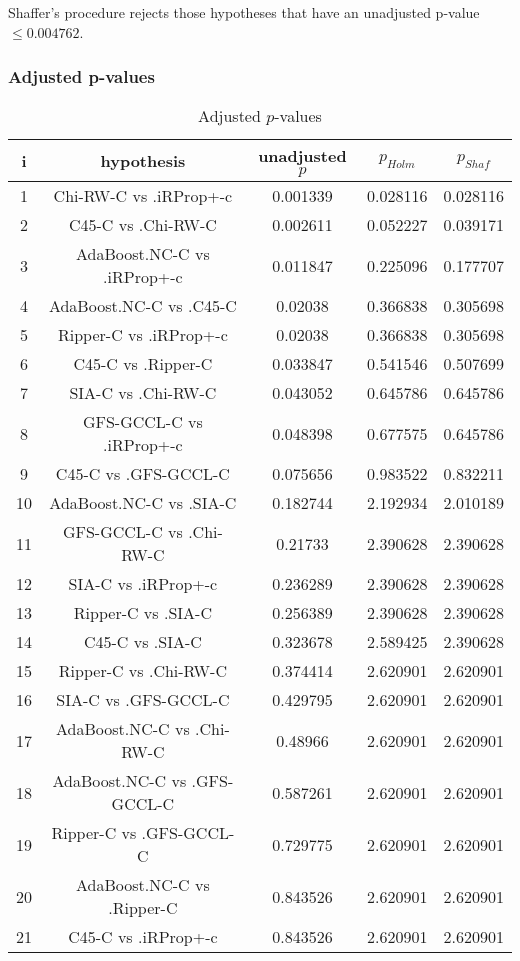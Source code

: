 \documentclass[a4paper,10pt]{article}
\begin{document}
Shaffer's procedure rejects those hypotheses that have an unadjusted p-value $\le0.004762$.

\pagebreak

\subsubsection{Adjusted p-values}

\begin{table}[!htp]
\centering\scriptsize
\begin{tabular}{ccccc}
i&hypothesis&unadjusted $p$&$p_{Holm}$&$p_{Shaf}$\\
\hline1&Chi-RW-C vs .iRProp+-c&0.001339&0.028116&0.028116\\
2&C45-C vs .Chi-RW-C&0.002611&0.052227&0.039171\\
3&AdaBoost.NC-C vs .iRProp+-c&0.011847&0.225096&0.177707\\
4&AdaBoost.NC-C vs .C45-C&0.02038&0.366838&0.305698\\
5&Ripper-C vs .iRProp+-c&0.02038&0.366838&0.305698\\
6&C45-C vs .Ripper-C&0.033847&0.541546&0.507699\\
7&SIA-C vs .Chi-RW-C&0.043052&0.645786&0.645786\\
8&GFS-GCCL-C vs .iRProp+-c&0.048398&0.677575&0.645786\\
9&C45-C vs .GFS-GCCL-C&0.075656&0.983522&0.832211\\
10&AdaBoost.NC-C vs .SIA-C&0.182744&2.192934&2.010189\\
11&GFS-GCCL-C vs .Chi-RW-C&0.21733&2.390628&2.390628\\
12&SIA-C vs .iRProp+-c&0.236289&2.390628&2.390628\\
13&Ripper-C vs .SIA-C&0.256389&2.390628&2.390628\\
14&C45-C vs .SIA-C&0.323678&2.589425&2.390628\\
15&Ripper-C vs .Chi-RW-C&0.374414&2.620901&2.620901\\
16&SIA-C vs .GFS-GCCL-C&0.429795&2.620901&2.620901\\
17&AdaBoost.NC-C vs .Chi-RW-C&0.48966&2.620901&2.620901\\
18&AdaBoost.NC-C vs .GFS-GCCL-C&0.587261&2.620901&2.620901\\
19&Ripper-C vs .GFS-GCCL-C&0.729775&2.620901&2.620901\\
20&AdaBoost.NC-C vs .Ripper-C&0.843526&2.620901&2.620901\\
21&C45-C vs .iRProp+-c&0.843526&2.620901&2.620901\\
\hline
\end{tabular}
\caption{Adjusted $p$-values}
\end{table}


\end{document}
